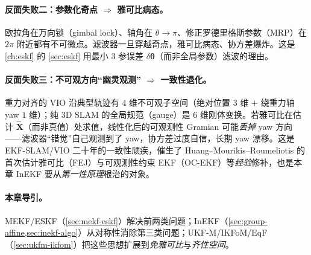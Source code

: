 \paragraph{反面失败二：参数化奇点 $\Rightarrow$ 雅可比病态。}
欧拉角在万向锁（gimbal lock）、轴角在 $\theta\to\pi$、修正罗德里格斯参数（MRP）在 $2\pi$ 附近都有不可微点。滤波器一旦穿越奇点，雅可比病态、协方差爆炸。这是 \cref{ch:eskf} 的 \cref{sec:eskf} 用最小 $3$ 参误差 $\delta\boldsymbol{\theta}$（而非全局参数）滤波的理由。

\paragraph{反面失败三：不可观方向“幽灵观测” $\Rightarrow$ 一致性退化。}
重力对齐的 VIO 沿典型轨迹有 $4$ 维不可观子空间（绝对位置 $3$ 维 $+$ 绕重力轴 yaw $1$ 维）；纯 $3$D SLAM 的全局规范（gauge）是 $6$ 维刚体变换。若雅可比在估计 $\hat{\mathbf{X}}$（而非真值）处求值，线性化后的可观测性 Gramian 可能\emph{丢掉} yaw 方向——滤波器“错觉”自己观测到了 yaw，协方差过度自信，长期 yaw 漂移\cite{sola2017quaternion}。这是 EKF-SLAM/VIO 二十年的一致性顽疾，催生了 Huang--Mourikis--Roumeliotis 的首次估计雅可比（FEJ）与可观测性约束 EKF（OC-EKF）等\emph{经验}修补，也是本章 InEKF 要从\emph{第一性原理}根治的对象。

\paragraph{本章导引。}
MEKF/ESKF（\cref{sec:mekf-eskf}）解决前两类问题；InEKF（\cref{sec:group-affine,sec:inekf-algo}）从对称性消除第三类问题；UKF-M/IKFoM/EqF（\cref{sec:ukfm-ikfom}）把这些思想扩展到\emph{免雅可比}与\emph{齐性空间}。

